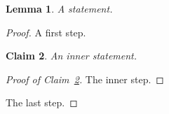 \documentclass{article}
\newtheorem{lemma}{Lemma}
\newtheorem{claim}[lemma]{Claim}
\begin{document}
\begin{lemma}\label{lem:a}
A statement.
\end{lemma}
\begin{proof}
A first step.
\begin{claim}\label{cl:one}
An inner statement.
\end{claim}
\begin{proof}[Proof of Claim~\ref{cl:one}]
The inner step.
\end{proof}
The last step.
\end{proof}
\end{document}
